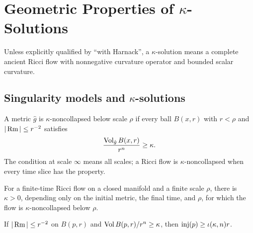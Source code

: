 \chapter[19]{\texorpdfstring{Geometric Properties of $\kappa$-Solutions}{Geometric Properties of Kappa-Solutions}}
\label{ch:chow-iii-kappa-solutions}

Unless explicitly qualified by ``with Harnack'', a \(\kappa\)-solution means
a complete ancient Ricci flow with nonnegative curvature operator and bounded
scalar curvature.

\section{\texorpdfstring{Singularity models and $\kappa$-solutions}{Singularity models and Kappa-solutions}}

\begin{definition}
\label{def:chow-iii-kappa-noncollapsed}

A metric $\hat g$ is $\kappa$-noncollapsed below scale $\rho$ if every ball
$B(x,r)$ with $r<\rho$ and $|\operatorname{Rm}|\le r^{-2}$ satisfies
\[
\frac{\operatorname{Vol}_{\hat g}B(x,r)}{r^n}\ge\kappa.
\]
The condition at scale $\infty$ means all scales; a Ricci flow is
$\kappa$-noncollapsed when every time slice has the property.
\end{definition}

\begin{theorem}
\label{thm:chow-iii-no-local-collapsing}

For a finite-time Ricci flow on a closed manifold and a finite scale $\rho$,
there is $\kappa>0$, depending only on the initial metric, the final time,
and $\rho$, for which the flow is $\kappa$-noncollapsed below $\rho$.
\end{theorem}

\begin{proposition}
\label{prop:chow-iii-cgt-injectivity}


If $|\operatorname{Rm}|\le r^{-2}$ on $B(p,r)$ and
$\operatorname{Vol} B(p,r)/r^n\ge\kappa$, then $\operatorname{inj}(p)\ge\iota(\kappa,n)r$.
\end{proposition}

